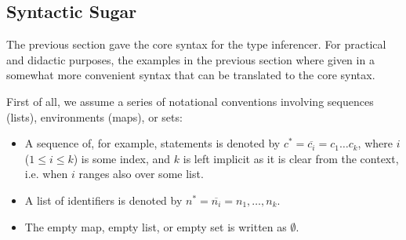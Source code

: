 \documentclass[preprint,natbib]{sigplanconf}
\renewcommand{\leq}{\leqslant}
\newcommand\Statement{c}
\newcommand\Statements{\Statement^*}
\newcommand\Idents[1]{{#1}^{\!*}}
\begin{document}

  \subsection{Syntactic Sugar}
  
    The previous section gave the core syntax for the type inferencer. For practical and didactic purposes,
    the examples in the previous section where given in a somewhat more convenient syntax that can be
    translated to the core syntax.
    
    First of all, we assume a series of notational conventions involving sequences (lists), environments (maps), or sets:
    \begin{itemize}
    \item A sequence of, for example, statements is denoted by $\Statements = \overline{\Statement_i} = \Statement_1 \ldots \Statement_k$,
      where $i$ ($1 \leq i \leq k$) is some index, and $k$ is left implicit as it is clear from the context, i.e. when
      $i$ ranges also over some list.
    \item A list of identifiers is denoted by $\Idents{n} = \overline{n_i} = n_1, \ldots, n_k$.
    \item The empty map, empty list, or empty set is written as $\emptyset$.
    \end{itemize}
    
\end{document}
